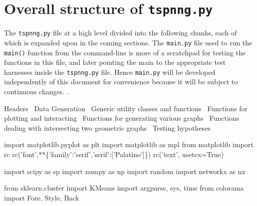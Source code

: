 \nwdocspar%

\section{Overall structure of \texttt{tspnng.py}}

The \texttt{tspnng.py} file at a high level divided into the following chunks, 
each of which is expanded upon in the coming sections. The \texttt{main.py} file used to run the \texttt{main()} function
from the command-line is more of a  scratchpad for testing the functions in this file, and later pointing the 
main to the appropriate test harnesses inside the \texttt{tspnng.py} file. Hence \texttt{main.py} will be developed 
independently of this document for convenience because it will be subject to continuous changes. .  

\nwenddocs{}\endmoddef\nwstartdeflinemarkup\nwenddeflinemarkup

\LA{}Headers~{\nwtagstyle{}}\RA{}
\LA{}Data Generation~{\nwtagstyle{}}\RA{}
\LA{}Generic utility classes and functions~{\nwtagstyle{}}\RA{}
\LA{}Functions for plotting and interacting~{\nwtagstyle{}}\RA{}
\LA{}Functions for generating various graphs~{\nwtagstyle{}}\RA{}
\LA{}Functions dealing with intersecting two geometric graphs~{\nwtagstyle{}}\RA{}
\LA{}Testing hypotheses~{\nwtagstyle{}}\RA{}
\nwendcode{}\nwdocspar


\nwenddocs{}\endmoddef\nwstartdeflinemarkup{}\nwenddeflinemarkup
import matplotlib.pyplot as plt
import matplotlib as mpl
from matplotlib import rc
rc('font',**\{'family':'serif','serif':['Palatino']\})
rc('text', usetex=True)

import scipy as sp
import numpy as np
import random
import networkx as nx

from sklearn.cluster import KMeans
import argparse, sys, time
from colorama import Fore, Style, Back
\nwendcode{}\nwdocspar


